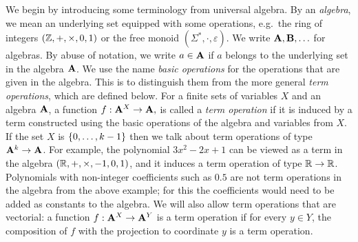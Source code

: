  We begin by introducing some terminology from universal algebra. By an \emph{algebra}, we mean an underlying set equipped with some  operations, e.g.~the ring of integers $(\mathbb Z, + , \times, 0, 1)$ or the free monoid $(\Sigma^*, \cdot, \varepsilon)$. We write $\mathbf{A}, \mathbf{B}, \ldots$ for algebras. By abuse of notation, we write $a \in \mathbf{A}$ if $a$ belongs to the underlying set in the algebra $\mathbf{A}$. 
We use the name \emph{basic operations} for the operations that are given in the algebra. This is to distinguish them from the more general \emph{term operations}, which are defined below.
        For a finite sets of variables $X$ and an algebra $\mathbf{A}$, a function $f : \mathbf{A}^X \to \mathbf{A},$
            is called a \emph{term operation} if it is induced by a  term  constructed using the basic operations of the algebra and variables from $X$.  If the set $X$ is $\{0,\ldots,k-1\}$ then we talk about term operations of type $\mathbf{A}^k \to \mathbf{A}$.
        For example, the polynomial $3x^2 -2x+1$ can be viewed as a term in the algebra
            $(\mathbb R, +,\times, -1,0,1)$,
        and it induces a term operation of type $\mathbb R \to \mathbb R$. 
        Polynomials with non-integer coefficients such as $0.5$  are not term operations in the algebra from the above example; for this the coefficients would need to be added as constants to the algebra. We will also allow term operations that are vectorial: a function $f : \mathbf{A}^X \to \mathbf{A}^Y$ is a term operation if for every $y \in Y$, the composition of $f$ with the projection to coordinate $y$ is a term operation. 
        

